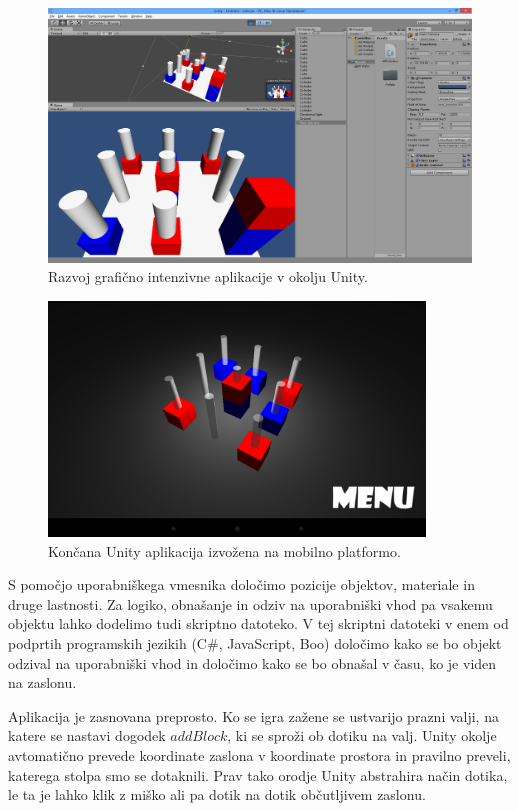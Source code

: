 \begin{figure}
\begin{center}
\includegraphics[width=12cm]{pic/min-editor.png}
\end{center}
\caption{Razvoj grafično intenzivne aplikacije v okolju Unity.}
\label{mineditor}
\end{figure} 

\begin{figure}
\begin{center}
\includegraphics[width=10cm]{pic/min-play.png}
\end{center}
\caption{Končana Unity aplikacija izvožena na mobilno platformo.}
\label{minplay}
\end{figure} 

S pomočjo uporabniškega vmesnika določimo pozicije objektov, materiale in druge lastnosti. Za logiko, obnašanje in odziv na uporabniški vhod pa vsakemu objektu lahko dodelimo tudi skriptno datoteko. V tej skriptni datoteki v enem od podprtih programskih jezikih (C\#, JavaScript, Boo) določimo kako se bo objekt odzival na uporabniški vhod in določimo kako se bo obnašal v času, ko je viden na zaslonu.

Aplikacija je zasnovana preprosto. Ko se igra zažene se ustvarijo prazni valji, na katere se nastavi dogodek $addBlock$, ki se sproži ob dotiku na valj. Unity okolje avtomatično prevede koordinate zaslona v koordinate prostora in pravilno preveli, katerega stolpa smo se dotaknili. Prav tako orodje Unity abstrahira način dotika, le ta je lahko klik z miško ali pa dotik na dotik občutljivem zaslonu.

